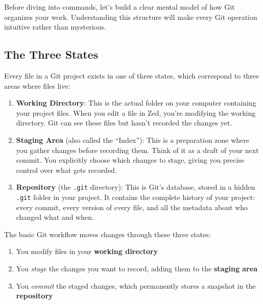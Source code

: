 \documentclass[
  letterpaper,
  DIV=11,
  numbers=noendperiod]{scrreprt}
\providecommand{\tightlist}{%
  \setlength{\itemsep}{0pt}\setlength{\parskip}{0pt}}
\begin{document}
Before diving into commands, let's build a clear mental model of how Git
organizes your work. Understanding this structure will make every Git
operation intuitive rather than mysterious.

\subsection{The Three States}\label{the-three-states}

Every file in a Git project exists in one of three states, which
correspond to three areas where files live:

\begin{enumerate}
\def\labelenumi{\arabic{enumi}.}
\item
  \textbf{Working Directory}: This is the actual folder on your computer
  containing your project files. When you edit a file in Zed, you're
  modifying the working directory. Git can see these files but hasn't
  recorded the changes yet.
\item
  \textbf{Staging Area} (also called the ``Index''): This is a
  preparation zone where you gather changes before recording them. Think
  of it as a draft of your next commit. You explicitly choose which
  changes to stage, giving you precise control over what gets recorded.
\item
  \textbf{Repository} (the \texttt{.git} directory): This is Git's
  database, stored in a hidden \texttt{.git} folder in your project. It
  contains the complete history of your project: every commit, every
  version of every file, and all the metadata about who changed what and
  when.
\end{enumerate}

The basic Git workflow moves changes through these three states:

\begin{enumerate}
\def\labelenumi{\arabic{enumi}.}
\tightlist
\item
  You modify files in your \textbf{working directory}
\item
  You \emph{stage} the changes you want to record, adding them to the
  \textbf{staging area}
\item
  You \emph{commit} the staged changes, which permanently stores a
  snapshot in the \textbf{repository}
\end{enumerate}
\end{document}

